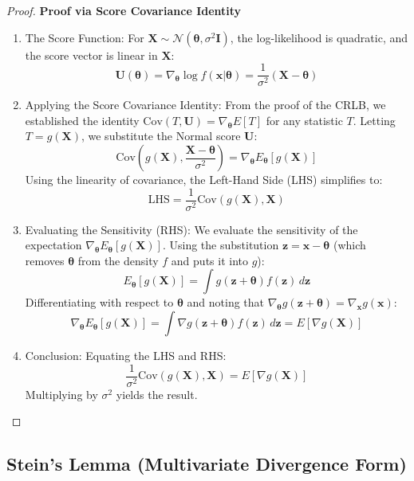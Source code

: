 \documentclass[
  letterpaper,
  DIV=11,
  numbers=noendperiod]{scrreprt}
\renewcommand{\[}{\begin{equation}}
\renewcommand{\]}{\end{equation}}
\theoremstyle{definition}
\theoremstyle{plain}
\theoremstyle{plain}
\theoremstyle{plain}
\theoremstyle{definition}
\theoremstyle{plain}
\theoremstyle{remark}
\begin{document}
\begin{proof}
\textbf{Proof via Score Covariance Identity}

\begin{enumerate}
\def\labelenumi{\arabic{enumi}.}
\item
  The Score Function: For
  \(\mathbf{X} \sim \mathcal{N}(\boldsymbol{\theta}, \sigma^2 \mathbf{I})\),
  the log-likelihood is quadratic, and the score vector is linear in
  \(\mathbf{X}\): \[
  \mathbf{U}(\boldsymbol{\theta}) = \nabla_{\boldsymbol{\theta}} \log f(\mathbf{x}|\boldsymbol{\theta}) = \frac{1}{\sigma^2}(\mathbf{X} - \boldsymbol{\theta})
  \]
\item
  Applying the Score Covariance Identity: From the proof of the CRLB, we
  established the identity
  \(\text{Cov}(T, \mathbf{U}) = \nabla_{\boldsymbol{\theta}} E[T]\) for
  any statistic \(T\). Letting \(T = g(\mathbf{X})\), we substitute the
  Normal score \(\mathbf{U}\): \[
  \text{Cov}\left( g(\mathbf{X}), \frac{\mathbf{X} - \boldsymbol{\theta}}{\sigma^2} \right) = \nabla_{\boldsymbol{\theta}} E_{\boldsymbol{\theta}}[g(\mathbf{X})]
  \] Using the linearity of covariance, the Left-Hand Side (LHS)
  simplifies to: \[
  \text{LHS} = \frac{1}{\sigma^2} \text{Cov}(g(\mathbf{X}), \mathbf{X})
  \]
\item
  Evaluating the Sensitivity (RHS): We evaluate the sensitivity of the
  expectation
  \(\nabla_{\boldsymbol{\theta}} E_{\boldsymbol{\theta}}[g(\mathbf{X})]\).
  Using the substitution
  \(\mathbf{z} = \mathbf{x} - \boldsymbol{\theta}\) (which removes
  \(\boldsymbol{\theta}\) from the density \(f\) and puts it into
  \(g\)): \[
  E_{\boldsymbol{\theta}}[g(\mathbf{X})] = \int g(\mathbf{z} + \boldsymbol{\theta}) f(\mathbf{z}) \, d\mathbf{z}
  \] Differentiating with respect to \(\boldsymbol{\theta}\) and noting
  that
  \(\nabla_{\boldsymbol{\theta}} g(\mathbf{z} + \boldsymbol{\theta}) = \nabla_{\mathbf{x}} g(\mathbf{x})\):
  \[
  \nabla_{\boldsymbol{\theta}} E_{\boldsymbol{\theta}}[g(\mathbf{X})] = \int \nabla g(\mathbf{z} + \boldsymbol{\theta}) f(\mathbf{z}) \, d\mathbf{z} = E[\nabla g(\mathbf{X})]
  \]
\item
  Conclusion: Equating the LHS and RHS: \[
  \frac{1}{\sigma^2} \text{Cov}(g(\mathbf{X}), \mathbf{X}) = E[\nabla g(\mathbf{X})]
  \] Multiplying by \(\sigma^2\) yields the result.
\end{enumerate}

\end{proof}

\subsection{Stein's Lemma (Multivariate Divergence
Form)}\label{steins-lemma-multivariate-divergence-form}
\end{document}
